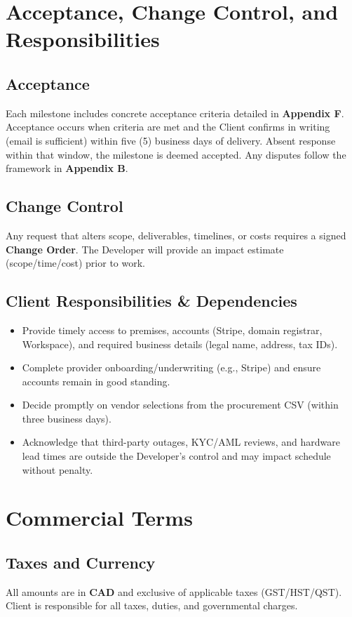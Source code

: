 \documentclass[11pt, a4paper]{article}
\begin{document}
\section{Acceptance, Change Control, and Responsibilities}
\subsection*{Acceptance}
Each milestone includes concrete acceptance criteria detailed in \textbf{Appendix F}. Acceptance occurs when criteria are met and the Client confirms in writing (email is sufficient) within five (5) business days of delivery. Absent response within that window, the milestone is deemed accepted. Any disputes follow the framework in \textbf{Appendix B}.

\subsection*{Change Control}
Any request that alters scope, deliverables, timelines, or costs requires a signed \textbf{Change Order}. The Developer will provide an impact estimate (scope/time/cost) prior to work.

\subsection*{Client Responsibilities \& Dependencies}
\begin{itemize}[leftmargin=*]
  \item Provide timely access to premises, accounts (Stripe, domain registrar, Workspace), and required business details (legal name, address, tax IDs).
  \item Complete provider onboarding/underwriting (e.g., Stripe) and ensure accounts remain in good standing.
  \item Decide promptly on vendor selections from the procurement CSV (within three business days).
  \item Acknowledge that third-party outages, KYC/AML reviews, and hardware lead times are outside the Developer’s control and may impact schedule without penalty.
\end{itemize}

\section{Commercial Terms}
\subsection*{Taxes and Currency}
All amounts are in \textbf{CAD} and exclusive of applicable taxes (GST/HST/QST). Client is responsible for all taxes, duties, and governmental charges.
\end{document}

